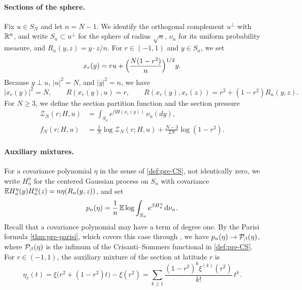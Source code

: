 \paragraph{Sections of the sphere.}
Fix $u\in S_N$ and let $n=N-1$. We identify the orthogonal complement $u^\perp$ with $\mathbb R^n$, and write $S_n\subset u^\perp$ for the sphere of radius $\sqrt n$, $\nu_n$ for its uniform probability measure, and $R_n(y,z)=y\cdot z/n$. For $r\in(-1,1)$ and $y\in S_n$, we set
\begin{equation}\label{eq:pr-xr}
x_r(y)=ru+\Bigl(\frac{N(1-r^2)}{n}\Bigr)^{1/2}y .
\end{equation}
Because $y\perp u$, $|u|^2=N$, and $|y|^2=n$, we have
\begin{equation}\label{eq:pr-section-overlaps}
|x_r(y)|^2=N,\qquad R(x_r(y),u)=r,\qquad R(x_r(y),x_r(z))=r^2+(1-r^2)R_n(y,z).
\end{equation}
For $N\ge3$, we define the section partition function and the section pressure
\begin{align*}
\mathcal Z_N(r;H,u)&=\int_{S_n}e^{\beta H(x_r(y))}\,\nu_n(dy),\\
f_N(r;H,u)&=\frac1N\log\mathcal Z_N(r;H,u)+\frac{N-3}{2N}\log(1-r^2).
\end{align*}

\paragraph{Auxiliary mixtures.}
For a covariance polynomial $\eta$ in the sense of \cref{def:pre-CS}, not identically zero, we write $H_n^{\eta}$ for the centered Gaussian process on $S_n$ with covariance $\mathbb E H_n^\eta(y)H_n^\eta(z)=n\eta(R_n(y,z))$, and set
\[
p_n(\eta)=\frac1n\,\mathbb E\log\int_{S_n}e^{\beta H_n^\eta}\,\mathrm d\nu_n .
\]
Recall that a covariance polynomial may have a term of degree one. By the Parisi formula \cref{thm:pre-parisi}, which covers this case through \cite[Theorem~1]{Chen2013}, we have $p_n(\eta)\to\mathcal P_\beta(\eta)$, where $\mathcal P_\beta(\eta)$ is the infimum of the Crisanti--Sommers functional in \cref{def:pre-CS}. For $r\in(-1,1)$, the auxiliary mixture of the section at latitude $r$ is
\begin{equation}\label{eq:pr-etar}
\eta_r(t)=\xi\bigl(r^2+(1-r^2)t\bigr)-\xi(r^2)=\sum_{k\ge1}\frac{(1-r^2)^k\xi^{(k)}(r^2)}{k!}\,t^k .
\end{equation}

